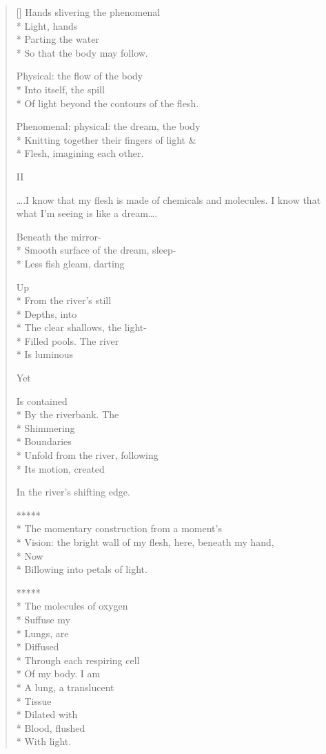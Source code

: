 \begin{verse}[\versewidth]
Hands slivering the phenomenal\\*
Light, hands\\*
Parting the water\\*
So that the body may follow.

Physical: the flow of the body\\*
Into itself, the spill\\*
Of light beyond the contours of the flesh.

Phenomenal:   physical:   the dream, the body\\*
Knitting together their fingers    of light \&\\*
Flesh, imagining each other.

                         

                                                   II

     \ldots .I know that my flesh is made of chemicals and molecules. I know that what I'm seeing is like a dream\ldots .

Beneath the mirror-\\*
Smooth surface of the dream,   sleep-\\*
Less fish gleam, darting

Up\\*
From the river's still\\*
Depths,   into\\*
The clear shallows,   the light-\\*
Filled pools.          The river\\*
Is luminous

Yet

Is contained\\*
By the riverbank.   The\\*
Shimmering\\*
Boundaries\\*
Unfold from the river, following\\*
Its motion, created

In the river's shifting edge.

     *****\\*
The momentary construction from a moment's\\*
Vision:   the bright wall of my flesh, here, beneath my hand,\\*
Now\\*
Billowing into petals of light.

      *****\\*
The molecules of oxygen\\*
Suffuse my\\*
Lungs, are\\*
Diffused\\*
Through each respiring cell\\*
Of my body.     I am\\*
A lung, a translucent\\*
Tissue\\*
Dilated with\\*
Blood, flushed\\*
With light.


\end{verse}

